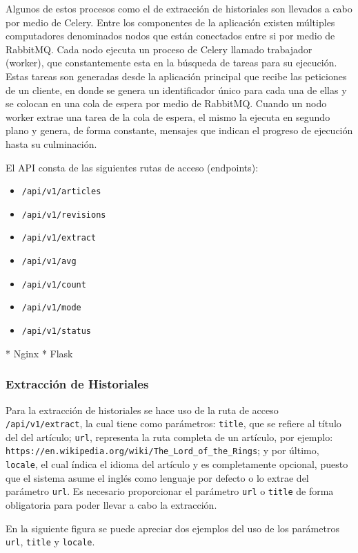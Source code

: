 Algunos de estos procesos como el de extracción de historiales son llevados a cabo por medio de Celery.
Entre los componentes de la aplicación existen múltiples computadores denominados nodos que están
conectados entre si por medio de RabbitMQ.
Cada nodo ejecuta un proceso de Celery llamado trabajador (worker), que constantemente esta en la
búsqueda de tareas para su ejecución.
Estas tareas son generadas desde la aplicación principal que recibe las peticiones de un cliente,
en donde se genera un identificador único para cada una de ellas y se colocan en una cola de espera
por medio de RabbitMQ.
Cuando un nodo worker extrae una tarea de la cola de espera, el mismo la ejecuta en segundo plano y
 genera, de forma constante, mensajes que indican el progreso de ejecución hasta su culminación.


El API consta de las siguientes rutas de acceso (endpoints):

\begin{itemize}
	\item \texttt{/api/v1/articles}
	\item \texttt{/api/v1/revisions}
	\item \texttt{/api/v1/extract}
	\item \texttt{/api/v1/avg}
	\item \texttt{/api/v1/count}
	\item \texttt{/api/v1/mode}
	\item \texttt{/api/v1/status}
\end{itemize}

* Nginx
* Flask

\subsubsection{Extracción de Historiales}

Para la extracción de historiales se hace uso de la ruta de acceso \texttt{/api/v1/extract}, la cual
tiene como parámetros:
\texttt{title}, que se refiere al título del del artículo; \texttt{url}, representa la ruta completa de un artículo, por ejemplo:
\texttt{https://en.wikipedia.org/wiki/The\_Lord\_of\_the\_Rings}; y por último, \texttt{locale}, el cual índica el idioma del artículo y
es completamente opcional, puesto que el sistema asume el inglés como lenguaje por defecto o lo extrae del parámetro
\texttt{url}.
Es necesario proporcionar el parámetro \texttt{url} o \texttt{title} de forma obligatoria para poder llevar a cabo la extracción.

En la siguiente figura se puede apreciar dos ejemplos del uso de los parámetros \texttt{url}, \texttt{title} y \texttt{locale}.

